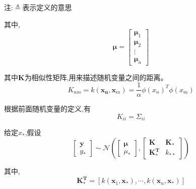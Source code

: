 \documentclass[UTF8,a4paper]{ctexart}
\begin{document}
            注:$\triangleq$表示定义的意思

            其中,
            \begin{equation}
                \bm \mu = \left [
                    \begin{array}{c}
                    \bm \mu_1 \\
                    \bm \mu_2\\
                    \vdots \\
                    \bm \mu_n
                    \end{array}
                \right ]
            \end{equation}

            其中$\bm{K}$为相似性矩阵,用来描述随机变量之间的距离。
            \begin{equation}
                K_{nm} = k(\bm{x_n} , \bm x_m) = \frac{1}{\alpha}\phi(x_n)^T\phi(x_m)
            \end{equation}

            根据前面随机变量的定义,有
            \begin{equation}
                K_{ii} = \Sigma_{ii}
            \end{equation}

            给定$x_*$,假设
            \begin{equation}
                \left [ \begin{array}{c}
                    \bm{y} \\ y_*
                \end{array} \right ] \sim \mathcal{N}
                \left (
                    \left [\begin{array}{c}
                    \bm{\mu} \\ \mu_*
                    \end{array} \right ] ,
                    \left [\begin{array}{cc}
                    \bm{K} & \bm{K_*} \\
                    \bm{K_*^T} & k_{**}
                    \end{array} \right ]
                \right )
            \end{equation}

            其中,
            \begin{equation}
                \bm{K_*^T} = [ k(\bm x_1,\bm x_*) , \cdots , k(\bm x_n , \bm x_*) ]
            \end{equation}
\end{document}
